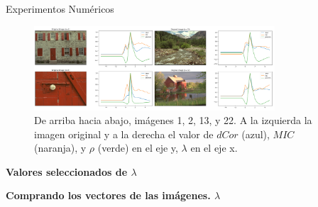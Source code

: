 \documentclass{beamer}
\begin{document}
\begin{frame}{Experimentos Numéricos}
    \begin{figure}[H]
        \centering
        \includegraphics[width=0.8\textwidth]{lam_v_com_all_img_hist.png}
        \caption{De arriba hacia abajo, im\'agenes 1, 2, 13, y 22. A la izquierda la imagen original y a la derecha el valor de $dCor$ (azul), $MIC$ (naranja), y $\rho$ (verde) en el eje y, $\lambda$ en el eje x.}
    \end{figure}
\end{frame}

\begin{frame}
    \begin{center}
        {\LARGE\bf Valores seleccionados de $\lambda$}
    \end{center}
    \begin{center}
        {\Large\bf Comprando los vectores de las imágenes. $\lambda$}
    \end{center}
\end{frame}
\end{document}
